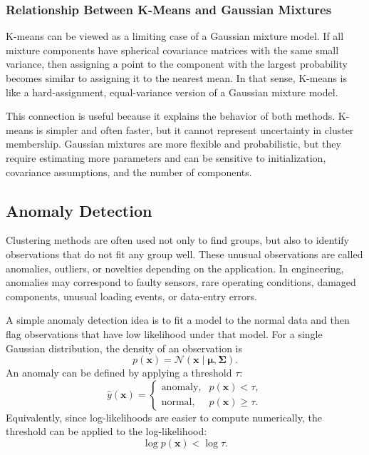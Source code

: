\documentclass[12pt,letter]{article}
\begin{document}
\subsubsection{Relationship Between K-Means and Gaussian Mixtures}

K-means can be viewed as a limiting case of a Gaussian mixture model. If all mixture components have spherical covariance matrices with the same small variance, then assigning a point to the component with the largest probability becomes similar to assigning it to the nearest mean. In that sense, K-means is like a hard-assignment, equal-variance version of a Gaussian mixture model.

This connection is useful because it explains the behavior of both methods. K-means is simpler and often faster, but it cannot represent uncertainty in cluster membership. Gaussian mixtures are more flexible and probabilistic, but they require estimating more parameters and can be sensitive to initialization, covariance assumptions, and the number of components.

\subsection{Anomaly Detection}

Clustering methods are often used not only to find groups, but also to identify observations that do not fit any group well. These unusual observations are called anomalies, outliers, or novelties depending on the application. In engineering, anomalies may correspond to faulty sensors, rare operating conditions, damaged components, unusual loading events, or data-entry errors.

A simple anomaly detection idea is to fit a model to the normal data and then flag observations that have low likelihood under that model. For a single Gaussian distribution, the density of an observation is
\begin{equation}
    p(\mathbf{x})
    =
    \mathcal{N}
    \left(
        \mathbf{x}
        \mid
        \boldsymbol{\mu},
        \boldsymbol{\Sigma}
    \right).
\end{equation}
An anomaly can be defined by applying a threshold \(\tau\):
\begin{equation}
    \hat{y}(\mathbf{x})
    =
    \begin{cases}
    \text{anomaly}, & p(\mathbf{x}) < \tau,\\
    \text{normal}, & p(\mathbf{x}) \geq \tau.
    \end{cases}
\end{equation}
Equivalently, since log-likelihoods are easier to compute numerically, the threshold can be applied to the log-likelihood:
\begin{equation}
    \log p(\mathbf{x}) < \log \tau.
\end{equation}
\end{document}
